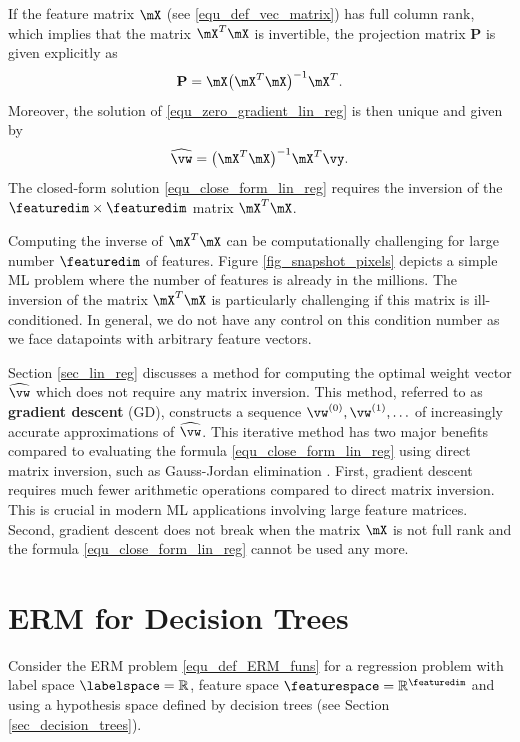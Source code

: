 \documentclass[12pt]{report}
\begin{document}
If the feature matrix $\mX$ (see \eqref{equ_def_vec_matrix}) has full column rank, 
which implies that the matrix $\mX^{T} \mX$ is invertible, the projection matrix $\mathbf{P}$ 
is given explicitly as 
\begin{equation} 
\nonumber
\mathbf{P} = \mX \big( \mX^{T} \mX \big)^{-1} \mX^{T}. 
\end{equation} 
Moreover, the solution of \eqref{equ_zero_gradient_lin_reg} is then unique and given by 
\begin{equation}
\label{equ_close_form_lin_reg}
\widehat{\vw} = \big(  \mX^{T} \mX \big)^{-1} \mX^{T} \vy. 
\end{equation}
The closed-form solution \eqref{equ_close_form_lin_reg} requires 
the inversion of the $\featuredim \times \featuredim$ matrix $\mX^{T} \mX$. 

Computing the inverse of $\mX^{T} \mX$ can be computationally challenging 
for large number $\featuredim$ of features. Figure \ref{fig_snapshot_pixels} 
depicts a simple ML problem where the number of features is already 
in the millions. The inversion of the matrix $\mX^{T} \mX$ is particularly 
challenging if this matrix is ill-conditioned. In general, we do not have 
any control on this condition number as we face datapoints with arbitrary 
feature vectors. 

Section \ref{sec_lin_reg} discusses a method for computing the optimal weight vector 
$\widehat{\vw}$ which does not require any matrix inversion. This method, 
referred to as {\bf gradient descent} (GD), constructs a sequence 
$\vw^{(0)}, \vw^{(1)},\ldots$ of increasingly accurate approximations 
of $\widehat{\vw}$. This iterative method has two major benefits 
compared to evaluating the formula \eqref{equ_close_form_lin_reg} using 
direct matrix inversion, such as Gauss-Jordan elimination \cite{golub96}. 
First, gradient descent requires much fewer arithmetic operations compared 
to direct matrix inversion. This is crucial in modern ML applications involving 
large feature matrices. Second, gradient descent does not break when the 
matrix $\mX$ is not full rank and the formula \eqref{equ_close_form_lin_reg} 
cannot be used any more. 

\section{ERM for Decision Trees}
\label{sec_ERM_decision_tree}

Consider the ERM problem \eqref{equ_def_ERM_funs} for a regression 
problem with label space $\labelspace=\mathbb{R}$, feature space 
$\featurespace= \mathbb{R}^{\featuredim}$ and using a hypothesis 
space defined by decision trees (see Section \ref{sec_decision_trees}). 
\end{document}
